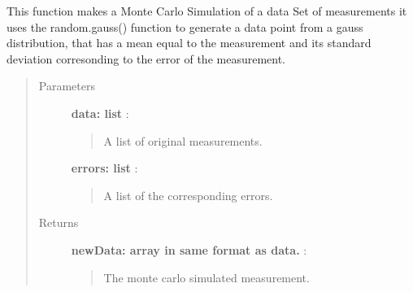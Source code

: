 \documentclass[a4paper,10pt,english]{sphinxmanual}
\begin{document}

\begin{fulllineitems}
\label{functions:astrolyze.functions.astro_functions.generate_monte_carlo_data_line}
This function makes a Monte Carlo Simulation of a data Set of measurements
it uses the random.gauss() function to generate a data point
from a gauss distribution, that has a mean equal to the measurement
and its standard deviation corresonding to the error of the measurement.
\begin{quote}\begin{description}
\item[{Parameters }] \leavevmode
\textbf{data: list} :
\begin{quote}

A list of original measurements.
\end{quote}

\textbf{errors: list} :
\begin{quote}

A list of the corresponding errors.
\end{quote}

\item[{Returns }] \leavevmode
\textbf{newData: array in same format as data.} :
\begin{quote}

The monte carlo simulated measurement.
\end{quote}

\end{description}\end{quote}







\end{fulllineitems}

\end{document}
